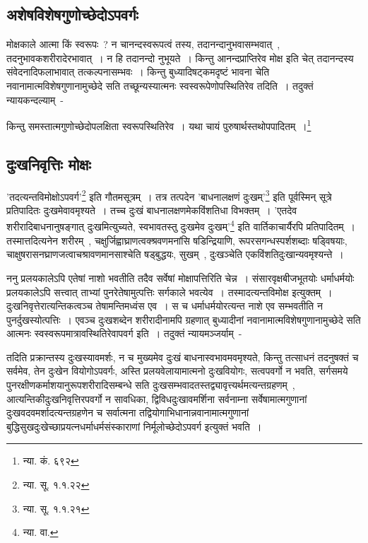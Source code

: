 		\subsection{अशेषविशेषगुणोच्छेदोऽपवर्गः}

		मोक्षकाले आत्मा किं स्वरूपः~? न चानन्दस्वरूपत्वं तस्य, तदानन्दानुभवासम्भवात्~, तदनुभावकशरीरादेरभावात्~। न हि तदानन्दो नुभूयते~। किन्तु आनन्दप्राप्तिरेव मोक्ष इति चेत् तदानन्दस्य संवेदनादिफलाभावात् तत्कल्पनासम्भवः~। किन्तु बुध्यादिषट्कमदृष्टं भावना चेति नवानामात्मविशेषगुणानामुच्छेदे सति तच्छून्यस्यात्मनः स्वस्वरूपेणोपस्थितिरेव तदिति~। तदुक्तं न्यायकन्दल्याम्~- 

		{\fontsize{11.7}{0}\selectfont\s किन्तु समस्तात्मगुणोच्छेदोपलक्षिता स्वरूपस्थितिरेव~। यथा चायं पुरुषार्थस्तथोपपादितम्~।\footnote{न्या. कं. ६९२}}

		\subsection{दुःखनिवृत्तिः मोक्षः} 

		'तदत्यन्तविमोक्षोऽपवर्ग'\footnote{न्या. सू. १.१.२२} इति गौतमसूत्रम्~। तत्र तत्पदेन 'बाधनालक्षणं दुःखम्'\footnote{न्या. सू. १.१.२१} इति पूर्वस्मिन् सूत्रे प्रतिपादितः दुःखमेवावमृश्यते~। तच्च दुःखं बाधनालक्षणमेकविंशतिधा विभक्तम्~। 'एतदेव शरीरादिबाधनानुषङ्गात् दुःखमित्युच्यते, स्वभावतस्तु दुःखमेव दुःखम्'\footnote{न्या. वा. } इति वार्तिकाचार्यैरपि प्रतिपादितम्~। तस्मात्तदित्यनेन शरीरम्~, चक्षुर्जिह्वाघ्राणत्वक्श्रवणमनांसि षडिन्द्रियाणि, रूपरसगन्धस्पर्शशब्दाः षड्विषयाः, चाक्षुषरासनघ्राणजत्वाचश्रावणमानसाश्चेति षड्बुद्धयः, सुखम्~, दुःखञ्चेति एकविंशतिदुःखान्यवमृश्यन्ते~।

		ननु प्रलयकालेऽपि एतेषां नाशो भवतीति तदैव सर्वेषां मोक्षापत्तिरिति चेन्न~। संसारवृक्षबीजभूतयोः धर्माधर्मयोः प्रलयकालेऽपि सत्त्वात् ताभ्यां पुनरेतेषामुत्पत्तिः सर्गकाले भवत्येव~। तस्मादत्यन्तविमोक्ष इत्युक्तम्~। दुःखनिवृत्तेरात्यन्तिकत्वञ्च तेषामन्तिमध्वंस एव~। स च धर्माधर्मयोरत्यन्त नाशे एव सम्भवतीति न पुनर्दुखस्योत्पत्तिः~। एवञ्च दुःखशब्देन शरीरादीनामपि ग्रहणात् बुध्यादीनां नवानामात्मविशेषगुणानामुच्छेदे सति आत्मनः स्वस्वरूपमात्रावस्थितिरेवापवर्ग इति~। तदुक्तं न्यायमञ्जर्याम्~-

		{\fontsize{11.7}{0}\selectfont\s तदिति प्रक्रान्तस्य दुःखस्यावमर्शः, न च मुख्यमेव दुःखं बाधनास्वभावमवमृश्यते, किन्तु तत्साधनं तदनुषक्तं च सर्वमेव, तेन दुःखेन वियोगोऽपवर्गः, अस्ति प्रलयवेलायामात्मनो दुःखवियोगः, सत्वपवर्गो न भवति, सर्गसमये पुनरक्षीणकर्माशयानुरूपशरीरादिसम्बन्धे सति दुःखसम्भवादतस्तद्व्यावृत्त्यर्थमत्यन्तग्रहणम्~, आत्यन्तिकीदुःखनिवृत्तिरपवर्गो न सावधिका, द्विविधदुःखावमर्शिना सर्वनाम्ना सर्वेषामात्मगुणानां दुःखवदवमर्शादत्यन्तग्रहणेन च सर्वात्मना तद्वियोगाभिधानान्नवानामात्मगुणानां बुद्धिसुखदुःखेच्छाप्रयत्नधर्माधर्मसंस्काराणां निर्मूलोच्छेदोऽपवर्ग इत्युक्तं भवति~।}

